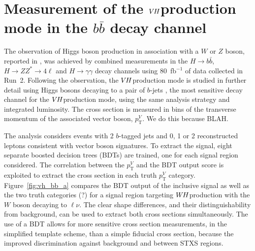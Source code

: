 \documentclass{moriond}
\def\wh{\texorpdfstring{\ensuremath{W\kern -0.1em H}\xspace}{WH\xspace}}
\def\vh{\texorpdfstring{\ensuremath{V\kern -0.1em H}\xspace}{VH\xspace}}
\begin{document}
\section{Measurement of the \vh production mode in the $b\bar b$ decay channel}\label{sec:vh_bb}

The observation of Higgs boson production in association with a $W$ or $Z$ boson, reported in
\cite{HIGG-2018-04}, was achieved by combined measurements in the $H{\rightarrow}b\bar b$,
$H{\rightarrow}ZZ^*{\rightarrow}4\ell$ and $H{\rightarrow}\gamma\gamma$ decay channels using
80~fb$^{-1}$ of data collected in Run~2.
Following the observation, the \vh production mode is studied in further detail using Higgs bosons
decaying to a pair of $b$-jets \cite{Aaboud:2019nan}, the most sensitive decay channel for the \vh production mode,
using the same analysis strategy and integrated luminosity.
The cross section is measured in bins of the transverse momentum of the associated vector boson,
$p^{V}_\mathrm{T}$. We do this because BLAH.

The analysis considers events with 2 $b$-tagged jets and 0, 1 or 2 reconstructed leptons consistent
with vector boson signatures. To extract the signal, eight separate boosted decision trees (BDTs)
are trained, one for each signal region considered.
The correlation between the $p^{V}_\mathrm{T}$ and the BDT output score is exploited
to extract the cross section in each truth $p^{V}_\mathrm{T}$ category.
Figure~\ref{fig:vh_bb_a} compares the BDT output of the inclusive signal as well as the two
truth categories (?) for a signal region targeting \wh production with the $W$ boson decaying to
$\ell\nu$. The clear shape differences, and their distinguishability from background, can be used to
extract both cross sections simultaneously. The use of a BDT allows for more sensitive cross section
measurements, in the simplified template scheme, than a simple fiducial cross section, because the
improved discrimination against background and between STXS regions.
\end{document}
